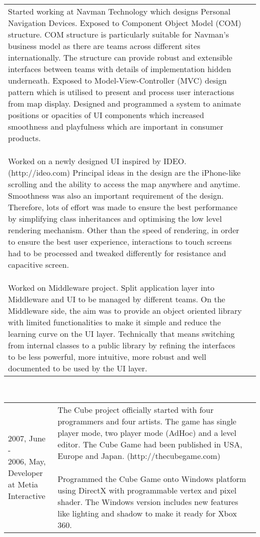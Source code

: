 \begin{resume}
\begin{tabular}{ll}
{Started working at Navman Technology which designs Personal Navigation Devices. Exposed to Component Object Model (COM) structure. COM structure is particularly suitable for Navman's business model as there are teams across different sites internationally. The structure can provide robust and extensible interfaces between teams with details of implementation hidden underneath. Exposed to Model-View-Controller (MVC) design pattern which is utilised to present and process user interactions from map display. Designed and programmed a system to animate positions or opacities of UI components which increased smoothness and playfulness which are important in consumer products.
\\\\
Worked on a newly designed UI inspired by IDEO. (http://ideo.com) Principal ideas in the design are the iPhone-like scrolling and the ability to access the map anywhere and anytime. Smoothness was also an important requirement of the design. Therefore, lots of effort was made to ensure the best performance by simplifying class inheritances and optimising the low level rendering mechanism. Other than the speed of rendering, in order to ensure the best user experience, interactions to touch screens had to be processed and tweaked differently for resistance and capacitive screen.
\\\\
Worked on Middleware project. Split application layer into Middleware and UI to be managed by different teams. On the Middleware side, the aim was to provide an object oriented library with limited functionalities to make it simple and reduce the learning curve on the UI layer. Technically that means switching from internal classes to a public library by refining the interfaces to be less powerful, more intuitive, more robust and well documented to be used by the UI layer.

}\end{tabular}\\
\begin{tabular}{ll}
\parbox[t]{30mm}{2007, June - \\ 2006, May,\\Developer\\at Metia Interactive} & \parbox[t]{116mm}{

The Cube project officially started with four programmers and four artists. The game has single player mode, two player mode (AdHoc) and a level editor. The Cube Game had been published in USA, Europe and Japan. (http://thecubegame.com)
\\\\
Programmed the Cube Game onto Windows platform using DirectX with programmable vertex and pixel shader. The Windows version includes new features like lighting and shadow to make it ready for Xbox 360.

}
\end{tabular}
\end{resume}
